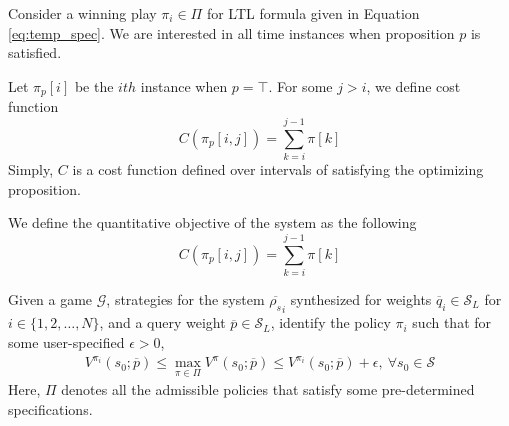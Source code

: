 Consider a winning play $\pi_i \in \Pi$ for LTL formula given in Equation \ref{eq:temp_spec}. 
We are interested in all time instances when proposition $p$ is satisfied. 


Let $\pi_p[i]$ be the $ith$ instance when $p = \top$. For some $j > i$, we define cost function 
\begin{equation}
    C(\pi_p[i,j]) = \sum_{k=i}^{j-1}\pi[k]
\end{equation}
Simply, $C$ is a cost function defined over intervals of satisfying the optimizing proposition. 

We define the quantitative objective of the system as the following
\begin{equation}
    C(\pi_p[i,j]) = \sum_{k=i}^{j-1}\pi[k]
\end{equation}


\begin{prob}
    Given a game $ \mathcal{G}$, strategies for the system $ \overline{\rho_s}_i$
    synthesized for weights $ \overline{q}_i\in
    \mathcal{S}_L$ for $i\in\{1,2,\ldots,N\}$, and a query
    weight $\overline{p}\in \mathcal{S}_L$, identify the
    policy $\pi_i$ such that for some user-specified
    $\epsilon >0$,
    \begin{align}
        V^{\pi_i}(s_0; \overline{p})\leq
        \max_{\pi\in\Pi}
        V^{\pi}(s_0; \overline{p}) \leq V^{\pi_i}(s_0;
        \overline{p}) + \epsilon,\ \forall s_0\in \mathcal{S}
    \end{align}
    Here, $\Pi$ denotes all the admissible policies that
    satisfy some pre-determined specifications.
\end{prob}

